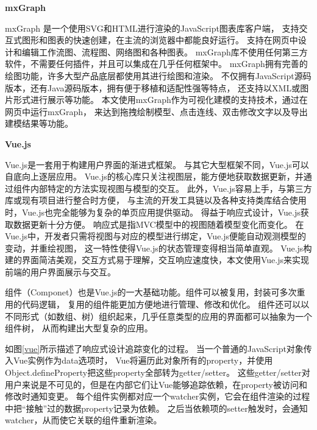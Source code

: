 \textbf{mxGraph}

mxGraph\footnotemark[5]
是一个使用SVG和HTML进行渲染的JavaScript图表库客户端，
支持交互式图形和图表的快速创建，在主流的浏览器中都能良好运行。
支持在网页中设计和编辑工作流图、流程图、网络图和各种图表。
mxGraph库不使用任何第三方软件，不需要任何插件，并且可以集成在几乎任何框架中。
mxGraph拥有完善的绘图功能，许多大型产品底层都使用其进行绘图和渲染。
不仅拥有JavaScript源码版本，还有Java源码版本，拥有便于移植和适配性强等特点，
还支持以XML或图片形式进行展示等功能。
本文使用mxGraph作为可视化建模的支持技术，通过在网页中运行mxGraph，
来达到拖拽绘制模型、点击连线、双击修改文字以及导出建模结果等功能。

\textbf{Vue.js}

Vue.js\footnotemark[6]是一套用于构建用户界面的渐进式框架。
与其它大型框架不同，Vue.js可以自底向上逐层应用。
Vue.js的核心库只关注视图层，能方便地获取数据更新，并通过组件内部特定的方法实现视图与模型的交互。
此外，Vue.js容易上手，与第三方库或现有项目进行整合时方便，
与主流的开发工具链以及各种支持类库结合使用时，Vue.js也完全能够为复杂的单页应用提供驱动。
得益于响应式设计，Vue.js获取数据更新十分方便。
响应式是指MVC模型中的视图随着模型变化而变化。
在Vue.js中，开发者只需将视图与对应的模型进行绑定，Vue.js便能自动观测模型的变动，并重绘视图，
这一特性使得Vue.js的状态管理变得相当简单直观。
Vue.js构建的界面简洁美观，交互方式易于理解，交互响应速度快，本文使用Vue.js来实现前端的用户界面展示与交互。

组件（Componet）也是Vue.js的一大基础功能。组件可以被复用，封装可多次重用的代码逻辑，
复用的组件能更加方便地进行管理、修改和优化。
组件还可以以不同形式（如数组、树）组织起来，几乎任意类型的应用的界面都可以抽象为一个组件树，
从而构建出大型复杂的应用。

如图\ref{vue}所示描述了响应式设计追踪变化的过程。
当一个普通的JavaScript对象传入Vue实例作为data选项时，
Vue将遍历此对象所有的property，并使用Object.defineProperty把这些property全部转为getter/setter。
这些getter/setter对用户来说是不可见的，但是在内部它们让Vue能够追踪依赖，在property被访问和修改时通知变更。
每个组件实例都对应一个watcher实例，它会在组件渲染的过程中把“接触”过的数据property记录为依赖。
之后当依赖项的setter触发时，会通知watcher，从而使它关联的组件重新渲染。


